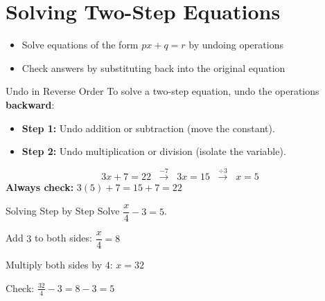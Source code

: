 \section{Solving Two-Step Equations}

\begin{learningGoals}
\begin{itemize}
    \item Solve equations of the form $px + q = r$ by undoing operations
    \item Check answers by substituting back into the original equation
\end{itemize}
\end{learningGoals}

\begin{conceptBox}{Undo in Reverse Order}
To solve a two-step equation, undo the operations \textbf{backward}:
\begin{itemize}[leftmargin=*]
    \item \textbf{Step 1:} Undo addition or subtraction (move the constant).
    \item \textbf{Step 2:} Undo multiplication or division (isolate the variable).
\end{itemize}
$$3x + 7 = 22 \;\;\xrightarrow{-7}\;\; 3x = 15 \;\;\xrightarrow{\div 3}\;\; x = 5$$
\textbf{Always check:} $3(5) + 7 = 15 + 7 = 22$ \checkmark
\end{conceptBox}

\begin{workedExample}{Solving Step by Step}
Solve $\dfrac{x}{4} - 3 = 5$.

Add $3$ to both sides: $\dfrac{x}{4} = 8$

Multiply both sides by $4$: $x = 32$

Check: $\frac{32}{4} - 3 = 8 - 3 = 5$ \checkmark
{}
\end{workedExample}


